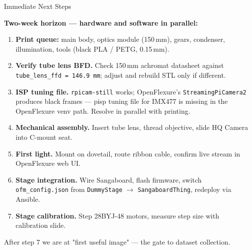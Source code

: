 \documentclass[aspectratio=169,11pt]{beamer}
\begin{document}
\begin{frame}{Immediate Next Steps}

  \textbf{Two-week horizon --- hardware and software in parallel:}

  \vspace{0.3em}

  \footnotesize
  \begin{enumerate}\itemsep=0.15em
    \item \textbf{Print queue:} main body, optics module (150\,mm), gears, condenser, illumination, tools (black PLA / PETG, 0.15\,mm).
    \item \textbf{Verify tube lens BFD.} Check 150\,mm achromat datasheet against \texttt{tube\_lens\_ffd = 146.9\,mm}; adjust and rebuild STL only if different.
    \item \textbf{ISP tuning file.} \texttt{rpicam-still} works; OpenFlexure's \texttt{StreamingPiCamera2} produces black frames --- pisp tuning file for IMX477 is missing in the OpenFlexure venv path. Resolve in parallel with printing.
    \item \textbf{Mechanical assembly.} Insert tube lens, thread objective, slide HQ Camera into C-mount seat.
    \item \textbf{First light.} Mount on dovetail, route ribbon cable, confirm live stream in OpenFlexure web UI.
    \item \textbf{Stage integration.} Wire Sangaboard, flash firmware, switch \texttt{ofm\_config.json} from \texttt{DummyStage} $\to$ \texttt{SangaboardThing}, redeploy via Ansible.
    \item \textbf{Stage calibration.} Step 28BYJ-48 motors, measure step size with calibration slide.
  \end{enumerate}

  \vspace{0.2em}
  \footnotesize After step 7 we are at "first useful image" --- the gate to dataset collection.

\end{frame}
\end{document}

